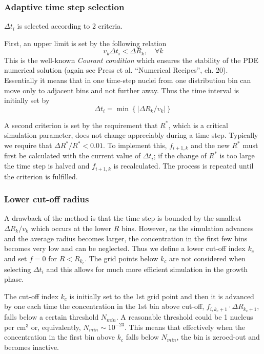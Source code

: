 \documentclass[12pt,a4paper]{article}
\begin{document}
\subsubsection{Adaptive time step selection}
$\Delta t_i$ is selected according to 2 criteria.

First, an upper limit is set by the following relation
\begin{equation}
v_k  \Delta t_i < \Delta R_k, \quad \forall k
\end{equation}
This is the well-known \textit{Courant condition} which ensures the stability of the PDE numerical solution (again see Press et al. ``Numerical Recipes'', ch. 20). Essentially it means that in one time-step nuclei from one distribution bin can move only to adjacent bins and not further away. Thus the time interval is initially set by
\begin{equation}
\Delta t_i = \min \left\lbrace  | \Delta R_k / v_k | \right\rbrace 
\end{equation}

A second criterion is set by the requirement that $R^*$, which is a critical simulation parameter, does not change appreciably during a time step. Typically we require that $\Delta R^* / R^* < 0.01$. To implement this, $f_{i+1,k}$ and the new $R^*$ must first be calculated with the current value of $\Delta t_i$; if the change of $R^*$ is too large the time step is halved and $f_{i+1,k}$ is recalculated. The process is repeated until the criterion is fulfilled. 

\subsubsection{Lower cut-off radius} 

A drawback of the method is that the time step is bounded by the smallest $\Delta R_k / v_k$ which occurs at the lower $R$ bins. However, as the simulation advances and the average radius becomes larger, the concentration in the first few bins becomes very low and can be neglected. Thus we define a lower cut-off index $k_c$ and set $f=0$ for $R<R_{k_c}$. The grid points below $k_c$ are not considered when selecting  $\Delta t_i$ and this allows for much more efficient simulation in the growth phase. 

The cut-off index $k_c$ is initially set to the 1st grid point and then it is advanced by one each time the concentration in the 1st bin above cut-off, $f_{i,k_c+1}\cdot \Delta R_{k_c+1}$, falls below a certain threshold $N_{min}$. A reasonable threshold could be 1 nucleus per cm$^3$ or, equivalently, $N_{min}\sim 10^{-23}$. This means that effectively when the concentration in the first bin above $k_c$ falls below $N_{min}$, the bin is zeroed-out and becomes inactive. 
\end{document}
